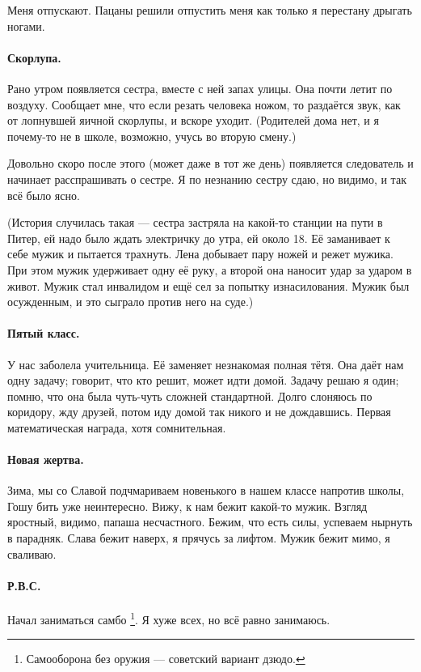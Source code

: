 \documentclass{book}
\begin{document}
Меня отпускают.
Пацаны решили отпустить меня как только я перестану дрыгать ногами.

\paragraph{Скорлупа.}
Рано утром появляется сестра, вместе с ней запах улицы.
Она почти летит по воздуху.
Сообщает мне, что если резать человека ножом, то раздаётся звук, как от лопнувшей яичной скорлупы, и
вскоре уходит.
(Родителей дома нет, и я почему-то не в школе, возможно, учусь во вторую смену.)

Довольно скоро после этого (может даже в тот же день) появляется следователь и начинает расспрашивать о сестре. 
Я по незнанию сестру сдаю, но видимо, и так всё было ясно.

(История случилась такая --- сестра застряла на какой-то станции на пути в Питер, ей надо было ждать электричку до утра, ей около 18.
Её заманивает к себе мужик и пытается трахнуть.
Лена добывает пару ножей и режет мужика.
При этом мужик удерживает одну её руку, а второй она наносит удар за ударом в живот.
Мужик стал инвалидом и ещё сел за попытку изнасилования.
Мужик был осужденным, и это сыграло против него на суде.)

\paragraph{Пятый класс.}
У нас заболела учительница.
Её заменяет незнакомая полная тётя.
Она даёт нам одну задачу; говорит, что кто решит, может идти домой.
Задачу решаю я один; помню, что она была чуть-чуть сложней стандартной.
Долго слоняюсь по коридору, жду друзей, 
потом иду домой так никого и не дождавшись.
Первая математическая награда, хотя сомнительная.

\paragraph{Новая жертва.}
Зима, мы со Славой подчмариваем новенького в нашем классе напротив школы,
Гошу бить уже неинтересно.
Вижу, к нам бежит какой-то мужик. 
Взгляд яростный, видимо, папаша несчастного.
Бежим, что есть силы, успеваем нырнуть в парадняк.
Слава бежит наверх, я прячусь за лифтом.
Мужик бежит мимо, я сваливаю.

\paragraph{Р.В.С.}
Начал заниматься самбо%
\footnote{Самооборона без оружия --- советский вариант дзюдо.}.
Я хуже всех, но всё равно занимаюсь.
\end{document}
